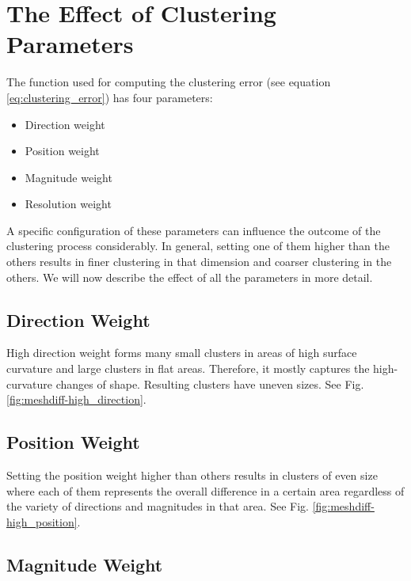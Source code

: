 \section{The Effect of Clustering Parameters}
\label{sec:analysis-parameter_effect}

The function used for computing the clustering error (see equation \ref{eq:clustering_error}) has four parameters:

\begin{itemize}
\item Direction weight
\item Position weight
\item Magnitude weight
\item Resolution weight
\end{itemize}

A specific configuration of these parameters can influence the outcome of the clustering process considerably. In general, setting one of them higher than the others results in finer clustering in that dimension and coarser clustering in the others. We will now describe the effect of all the parameters in more detail.

\subsection{Direction Weight}
\label{subsec:analysis-parameter_effect-direction}

High direction weight forms many small clusters in areas of high surface curvature and large clusters in flat areas. Therefore, it mostly captures the high-curvature changes of shape. Resulting clusters have uneven sizes. See Fig. \ref{fig:meshdiff-high_direction}.
\subsection{Position Weight}
\label{subsec:analysis-parameter_effect-position}

Setting the position weight higher than others results in clusters of even size where each of them represents the overall difference in a certain area regardless of the variety of directions and magnitudes in that area. See Fig. \ref{fig:meshdiff-high_position}.
\subsection{Magnitude Weight}
\label{subsec:analysis-parameter_effect-magnitude}

